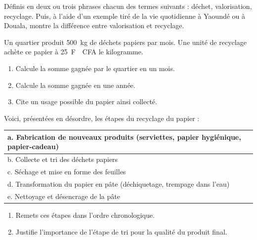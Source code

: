 \documentclass[11pt]{article}
\newcommand{\cle}[1]{{\popxbold\color{popdark}#1}}
\newcounter{popsec}
\newcounter{popsub}
\newcommand{\courssub}[1]{%
  \stepcounter{popsub}%
  \par\vspace{9pt}\noindent{\popxbold\fontsize{11.5}{13}\selectfont\color{popink}{\color{poporange}\thepopsec.\thepopsub}\hspace{6pt}#1}\par\nopagebreak\vspace{4pt}
}
\begin{document}
\begin{exercice}[Définitions]
Définis en deux ou trois phrases chacun des termes suivants : \cle{déchet}, \cle{valorisation}, \cle{recyclage}. Puis, à l'aide d'un exemple tiré de la vie quotidienne à Yaoundé ou à Douala, montre la différence entre valorisation et recyclage.
\end{exercice}

\begin{exercice}
Un quartier produit \SI{500}{kg} de déchets papiers par mois. Une unité de recyclage achète ce papier à \SI{25}{F\!CFA} le kilogramme.
\begin{enumerate}
\item Calcule la somme gagnée par le quartier en un mois.
\item Calcule la somme gagnée en une année.
\item Cite un usage possible du papier ainsi collecté.
\end{enumerate}
\end{exercice}

\courssub{Je m'entraîne}

\begin{exercice}
Voici, présentées en désordre, les étapes du recyclage du papier :
\begin{center}
\begin{tabular}{|l|}
\hline
a. Fabrication de nouveaux produits (serviettes, papier hygiénique, papier-cadeau) \\
\hline
b. Collecte et tri des déchets papiers \\
\hline
c. Séchage et mise en forme des feuilles \\
\hline
d. Transformation du papier en pâte (déchiquetage, trempage dans l'eau) \\
\hline
e. Nettoyage et désencrage de la pâte \\
\hline
\end{tabular}
\end{center}
\begin{enumerate}
\item Remets ces étapes dans l'ordre chronologique.
\item Justifie l'importance de l'étape de tri pour la qualité du produit final.
\end{enumerate}
\end{exercice}
\end{document}
